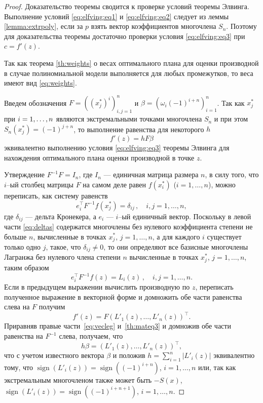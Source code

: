 \documentclass[specialist,
               substylefile = spbu.rtx,
               subf,href,colorlinks=true, 12pt]{disser}
\theoremstyle{definition}
\DeclareMathOperator*{\sign}{sign}
\newcommand{\hm}[1]{#1\nobreak\discretionary{}{\hbox{\ensuremath{#1}}}{}}
\newcommand\abs[1]{\left\lvert#1\right\rvert}
\begin{document}
	\begin{proof}
		Доказательство теоремы сводится к проверке условий теоремы Элвинга. Выполнение условий \eqref{eq:elfving:eq1} и \eqref{eq:elfving:eq2} следует из леммы \ref{lemma:extrpoly}, если за $p$ взять вектор коэффициентов многочлена $S_n$. Поэтому для доказательства теоремы достаточно проверки условия \eqref{eq:elfving:eq3} при $c = f'(z)$.
	
	Так как теорема \ref{th:weights} о весах оптимального плана для оценки производной в случае полиномиальной модели выполняется для любых промежутков, то веса имеют вид \eqref{eq:weights}.
	
	Введем обозначения $F = \left((x_j^*)^i\right)^n_{i, j = 1}$ и $\beta = \left( \omega_i (-1)^{i+n} \right)_{i=1}^n$. Так как $x_j^*$ при $i\hm{=}1, \ldots , n$ являются экстремальными точками многочлена $S_n$ и при этом $S_n(x_j^*) = (-1)^{j+n}$, то выполнение равенства для некоторого $h$
	\begin{equation}
		\label{th:mateq3}
		f'(z) = hF\beta
	\end{equation}
	 эквивалентно выполнению условия \eqref{eq:elfving:eq3} теоремы Элвинга для нахождения оптимального плана оценки производной в точке $z$.
	 
	Утверждение $F^{-1}F = I_n$, где $I_n$ --- единичная матрица размера $n$, в силу того, что $i$--ый столбец матрицы $F$ на самом деле равен $f(x_i^*)$ ($i = 1, \ldots, n$), можно переписать, как систему равенств
	\begin{equation}
	\label{eq:deltas}
		e_i^{\top} F^{-1} f(x_j^*) = \delta_{ij} \, , \quad i, j = 1, \ldots , n ,
	\end{equation}
	где $\delta_{ij}$ --- дельта Кронекера, а $e_i$ --- $i$--ый единичный вектор. Поскольку в левой части \eqref{eq:deltas} содержатся многочлены без нулевого коэффициента степени не больше $n$, вычисленные в точках $x_j^*$, $j=1, \ldots , n$, а для каждого $i$ существует только одно $j$, такое, что $\delta_{ij} \neq 0$, то они определяют все базисные многочлены Лагранжа без нулевого члена степени $n$ вычисленные в точках $x_j^*$, $j=1, \ldots , n$, таким образом
	\begin{equation*}
		e_i^{\top} F^{-1} f(z) = L_i(z) \, , \quad i, j = 1, \ldots , n .
	\end{equation*}
	Если в предыдущем выражении вычислить производную по $z$, переписать полученное выражение в векторной форме и домножить обе части равенства слева на $F$ получим
	\begin{equation}
		\label{eq:vecleg}
		f'(z) = F \left( L'_1(z), \ldots, L'_n(z) \right)^\top.
	\end{equation}
	Приравняв правые части~\eqref{eq:vecleg} и~\eqref{th:mateq3} и домножив обе части равенства на $F^{-1}$ слева, получаем, что
	\begin{equation*}
		h \beta = \left( L'_1(z), \ldots, L'_n(z) \right)^\top,
	\end{equation*}
	что с учетом известного вектора $\beta$ и положив $h = \sum_{i=1}^n \abs{L'_i(z)}$ эквивалентно тому, что $\sign (L'_i(z)) = \sign((-1)^{i+n}) $, $i = 1, \ldots, n$ или, так как экстремальным многочленом также может быть $-S(x)$,  $\sign (L'_i(z)) = \sign((-1)^{i+n+1}) $, $i = 1, \ldots, n$.
	

\end{proof}
\end{document}
